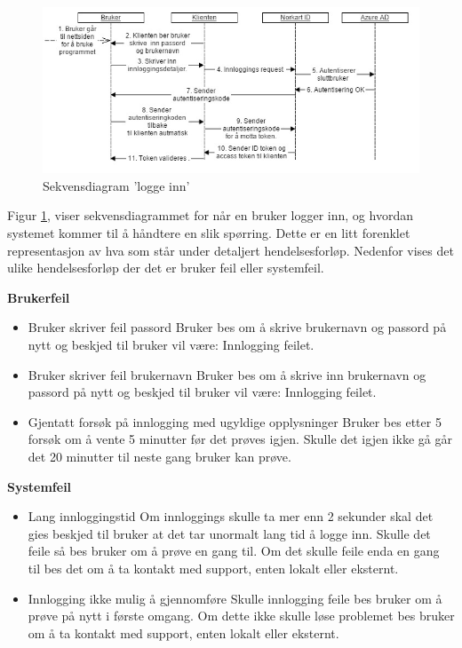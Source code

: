 \begin{figure}[H]
    \centering
    \includegraphics[scale=0.55]{graphics/04-arkitektur/UseCaseSekveknsdiagramLoggeInn.jpg}
    \caption{Sekvensdiagram 'logge inn'}
    \label{fig:skevensdiagramLoggInn}
\end{figure}

\noindent Figur \ref{fig:skevensdiagramLoggInn}, viser sekvensdiagrammet for når en bruker logger inn, og hvordan systemet kommer til å håndtere en slik spørring. Dette er en litt forenklet representasjon av hva som står under detaljert hendelsesforløp.
\newline
\newline
Nedenfor vises det ulike hendelsesforløp der det er bruker feil eller systemfeil.
\newline

\newline \textbf{Brukerfeil}
\begin{itemize}
\item Bruker skriver feil passord
\newline Bruker bes om å skrive brukernavn og passord på nytt og beskjed til bruker vil være: Innlogging feilet.
\item Bruker skriver feil brukernavn
\newline Bruker bes om å skrive inn brukernavn og passord på nytt og beskjed til bruker vil være: Innlogging feilet.
\item Gjentatt forsøk på innlogging med ugyldige opplysninger
\newline Bruker bes etter 5 forsøk om å vente 5 minutter før det prøves igjen. Skulle det igjen ikke gå går det 20 minutter til neste gang bruker kan prøve.
\end{itemize}

\bigskip \textbf{Systemfeil}
\begin{itemize}
\item Lang innloggingstid
\newline Om innloggings skulle ta mer enn 2 sekunder skal det gies beskjed til bruker at det tar unormalt lang tid å logge inn. Skulle det feile så bes bruker om å prøve en gang til. Om det skulle feile enda en gang til bes det om å ta kontakt med support, enten lokalt eller eksternt.
\item Innlogging ikke mulig å gjennomføre
\newline Skulle innlogging feile bes bruker om å prøve på nytt i første omgang. Om dette ikke skulle løse problemet bes bruker om å ta kontakt med support, enten lokalt eller eksternt.
\end{itemize}


